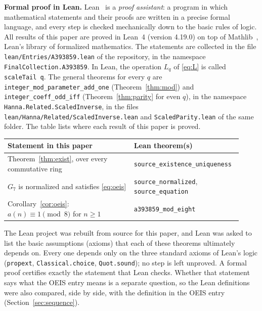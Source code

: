 \documentclass[11pt,a4paper]{article}
\theoremstyle{definition}
\theoremstyle{remark}
\newcommand{\para}[1]{\par\medskip\noindent\textbf{#1}\enspace}
\begin{document}
\para{Formal proof in Lean.}
Lean~\cite{lean} is a \emph{proof assistant}: a program in which mathematical statements and their proofs are written
in a precise formal language, and every step is checked mechanically down to the basic rules of logic. All results of
this paper are proved in Lean~4 (version 4.19.0) on top of Mathlib~\cite{mathlib}, Lean's library of formalized
mathematics. The statements are collected in the file \texttt{lean/Entries/A393859.lean} of the repository,
in the namespace \texttt{FinalCollection.A393859}. In Lean, the operation $L_q$ of \eqref{eq:L} is called \texttt{scaleTail q}. The general theorems for every $q$ are \texttt{integer\_mod\_parameter\_add\_one} (Theorem~\ref{thm:mod}) and \texttt{integer\_coeff\_odd\_iff} (Theorem~\ref{thm:parity} for even $q$), in the namespace \texttt{Hanna.\allowbreak Related.\allowbreak ScaledInverse}, in the files \texttt{lean/\allowbreak Hanna/\allowbreak Related/\allowbreak ScaledInverse.lean} and \texttt{ScaledParity.lean} of the same folder.
The table lists where each result of this paper is proved.
\begin{center}\small\renewcommand{\arraystretch}{1.25}
\begin{tabular}{>{\raggedright\arraybackslash}p{0.52\linewidth}>{\raggedright\arraybackslash}p{0.4\linewidth}}
\toprule
Statement in this paper & Lean theorem(s)\\
\midrule
Theorem~\ref{thm:exist}, over every commutative ring & \texttt{source\_\allowbreak{}existence\_\allowbreak{}uniqueness} \\
$G_{7}$ is normalized and satisfies \eqref{eq:oeis} & \texttt{source\_\allowbreak{}normalized}, \texttt{source\_\allowbreak{}equation} \\
Corollary~\ref{cor:oeis}: $a(n)\equiv1\pmod{8}$ for $n\ge1$ & \texttt{a393859\_\allowbreak{}mod\_\allowbreak{}eight} \\
\bottomrule
\end{tabular}
\end{center}
The Lean project was rebuilt from source for this paper, and Lean was asked to list the basic assumptions (axioms)
that each of these theorems ultimately depends on. Every one depends only on the three standard axioms of Lean's logic
(\texttt{propext}, \texttt{Classical.choice}, \texttt{Quot.sound}); no step is left unproved. A formal proof certifies
exactly the statement that Lean checks. Whether that statement says what the OEIS entry means is a separate question,
so the Lean definitions were also compared, side by side, with the definition in the OEIS entry
(Section~\ref{sec:sequence}).
\end{document}
